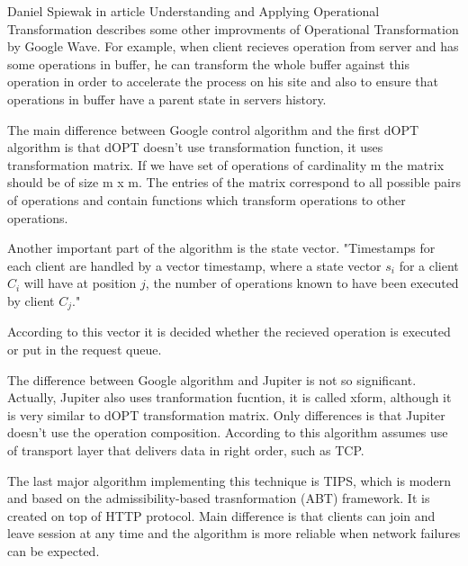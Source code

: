 \documentclass[12pt,oneside]{fithesis2}
\begin{document}
\par Daniel Spiewak in article Understanding and Applying Operational Transformation \cite{Spiewak} describes some other improvments of Operational Transformation by Google Wave. For example, when client recieves operation from server and has some operations in buffer, he can transform the whole buffer against this operation in order to accelerate the process on his site and also to ensure that operations in buffer have a parent state in servers history.
\par The main difference between Google control algorithm and the first dOPT algorithm is that dOPT doesn't use transformation function, it uses transformation matrix. If we have set of operations of cardinality m the matrix should be of size m x m. The entries of the matrix correspond to all possible pairs of operations and contain functions which transform operations to other operations. \par Another important part of the algorithm is the state vector. "Time\-stamps for each client are handled by a vector timestamp, where a state vector \(s_i\) for a client \(C_i \) will have at position \(j\), the number of operations known to have been executed by client \(C_j\)." \cite{Leung} \par According to this vector it is decided whether the recieved operation is executed or put in the request queue.
\par The difference between Google algorithm and Jupiter is not so significant. Actually, Jupiter also uses tranformation fucntion, it is called xform, although it is very similar to dOPT transformation matrix. Only differences is that Jupiter doesn't use the operation composition. According to \cite{Jupiter} this algorithm assumes use of transport layer that delivers data in right order, such as TCP.
\par The last major algorithm implementing this technique is TIPS, which is modern and based on the admissibility-based trasnformation (ABT) framework. It is created on top of HTTP protocol. Main difference is that clients can join and leave session at any time and the algorithm is more reliable when network failures can be expected. 
\end{document}
